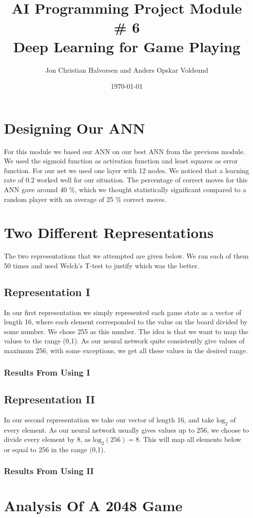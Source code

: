 \documentclass[11pt,a4paper]{article}
\author{Jon Christian Halvorsen and Anders Opskar Voldsund}
\title{ \textbf{ AI Programming Project Module \# 6 }  \\
Deep Learning for Game Playing }
\date{\today}
\begin{document}
\maketitle

\section*{Designing Our ANN}
For this module we based our ANN on our best ANN from the previous module. We used the sigmoid function as activation function and least squares as error function. For our net we used one layer with 12 nodes. We noticed that a learning rate of 0.2 worked well for our situation. The percentage of correct moves for this ANN gave around 40 $\%$, which we thought statistically significant compared to a random player with an average of 25 $\%$ correct moves.

\section*{Two Different Representations}
The two representations that we attempted are given below. We ran each of them 50 times and used Welch's T-test to justify which was the better.

\subsection*{Representation I}
In our first representation we simply represented each game state as a vector of length 16, where each element corresponded to the value on the board divided by some number. We chose 255 as this number. The idea is that we want to map the values to the range (0,1). As our neural network quite consistently give values of maximum 256, with some exceptions, we get all these values in the desired range.

\subsubsection*{Results From Using I}

\subsection*{Representation II}
In our second representation we take our vector of length 16, and take $\textrm{log}_2$ of every element. As our neural network usually gives values up to 256, we choose to divide every element by 8, as $\textrm{log}_2(256) = 8$. This will map all elements below or equal to 256 in the range (0,1).

\subsubsection*{Results From Using II}


\section*{Analysis Of A 2048 Game}
\end{document}
